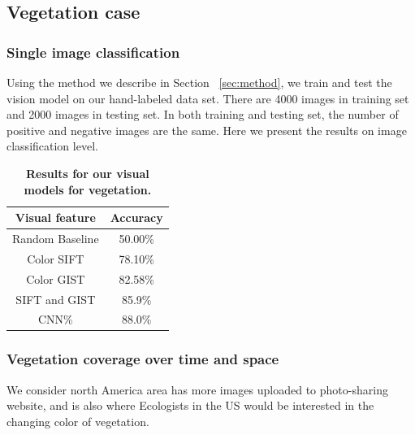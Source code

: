 \documentclass[10pt,journal,compsoc]{IEEEtran}
\begin{document}




\subsection{Vegetation case}

\subsubsection{Single image classification}


Using the method we describe in Section ~\ref{sec:method}, we train and test the vision model on our hand-labeled data set.
There are 4000 images in training set and 2000 images in testing set. In both training and testing set, the number of positive and negative images are the same. Here we present the results on image classification level.


\begin{table} 
 \caption {\textbf{Results for our  visual models for vegetation.}}
\label{tab:veg_img_classifier} 
\begin{center}
{
\begin{tabular} {|c|c|} 
\hline 
Visual feature &  Accuracy \tabularnewline
\hline 
\hline
Random Baseline & 50.00\%\tabularnewline
\hline
\hline
Color SIFT & 78.10\%\tabularnewline
\hline 
Color GIST & 82.58\% \tabularnewline
\hline 
\hline
SIFT and GIST& 85.9\% \tabularnewline
\hline 
CNN\% &  88.0\%\tabularnewline
\hline 
\end{tabular}
}
\end{center}
\end{table}




\subsubsection{Vegetation coverage over time and space}
We consider north America area has more images uploaded to photo-sharing website, and is also where Ecologists in the US would be interested in the changing color of vegetation. 
\end{document}
